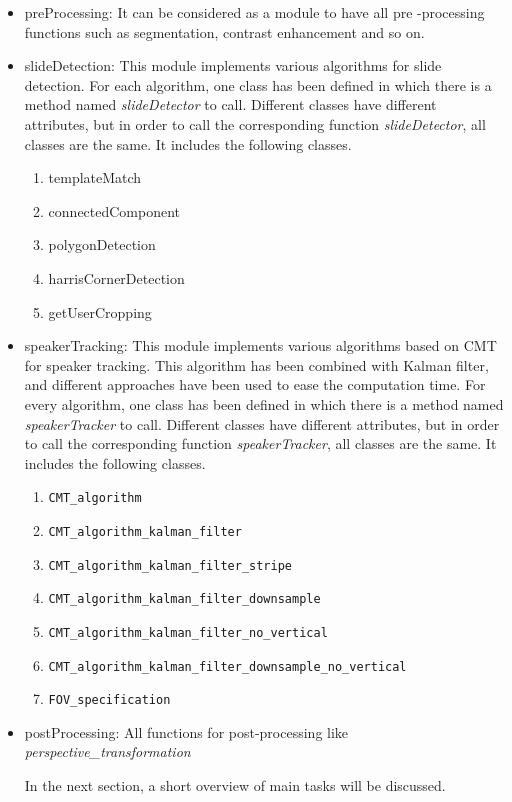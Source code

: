 \documentclass[[12pt,DIV14,BCOR12mm,a4paper,footexclude,headinclude,halfparskip-,twoside,openright,cleardoubleempty,idxtotoc,bibtotoc]{article}
\begin{document}
\begin{itemize}
\item preProcessing: It can be considered as a module to have all pre -processing functions such as segmentation, contrast enhancement and so on.

\item slideDetection: This module implements various algorithms for slide detection. For each algorithm, 
one class has been defined in which there is a method named \textit{slideDetector} to call.
Different classes have different attributes, but in order to call the corresponding function \textit{slideDetector}, all classes are the same. It includes the following classes.

\begin{enumerate}
\item templateMatch
\item connectedComponent
\item polygonDetection
\item harrisCornerDetection
\item getUserCropping
\end{enumerate}

\item speakerTracking: This module implements various algorithms based on CMT for speaker tracking. 
This algorithm has been combined with Kalman filter, and 
different approaches have been used to ease the computation time.
 For every algorithm, one class has been defined in which there is a method named \textit{speakerTracker} to call.
Different classes have different attributes, but in order to call the corresponding
function \textit{speakerTracker}, all classes are the same. It includes the following classes.

\begin{enumerate}
\item \texttt{CMT\_algorithm}
\item \texttt{CMT\_algorithm\_kalman\_filter}
\item \texttt{CMT\_algorithm\_kalman\_filter\_stripe}
\item \texttt{CMT\_algorithm\_kalman\_filter\_downsample}
\item \texttt{CMT\_algorithm\_kalman\_filter\_no\_vertical}
\item \texttt{CMT\_algorithm\_kalman\_filter\_downsample\_no\_vertical}
\item \texttt{FOV\_specification}
\end{enumerate}

\item postProcessing: All functions for post-processing like \textit{perspective\_transformation}

In the next section, a short overview of main tasks will be discussed.

\end{itemize}
\end{document}
